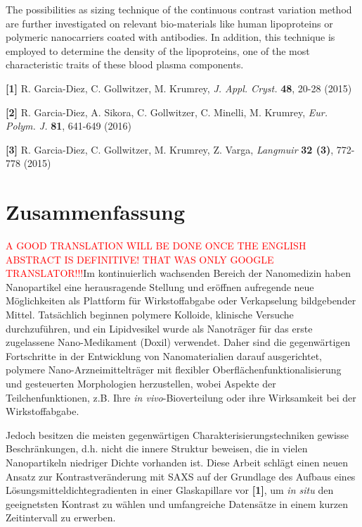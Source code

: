 The possibilities as sizing technique of the continuous contrast variation method are further investigated on relevant bio-materials like human lipoproteins or polymeric nanocarriers coated with antibodies. In addition, this technique is employed to determine the density of the lipoproteins, one of the most characteristic traits of these blood plasma components.

\bigskip
\footnotesize{

\textbf{[1]} R. Garcia-Diez, C. Gollwitzer, M. Krumrey, \emph{J. Appl. Cryst.} \textbf{48}, 20-28 (2015)

\textbf{[2]} R. Garcia-Diez, A. Sikora, C. Gollwitzer, C. Minelli, M. Krumrey, \emph{Eur. Polym. J.} \textbf{81}, 641-649 (2016)

\textbf{[3]} R. Garcia-Diez, C. Gollwitzer, M. Krumrey, Z. Varga, \emph{Langmuir} \textbf{32 (3)}, 772-778 (2015)

}
\normalsize

\cleardoublepage

\thispagestyle{empty}

\chapter*{Zusammenfassung}

\textcolor{red}{A GOOD TRANSLATION WILL BE DONE ONCE THE ENGLISH ABSTRACT IS DEFINITIVE! THAT WAS ONLY GOOGLE TRANSLATOR!!!}Im kontinuierlich wachsenden Bereich der Nanomedizin haben Nanopartikel eine herausragende Stellung und eröffnen aufregende neue Möglichkeiten als Plattform für Wirkstoffabgabe oder Verkapselung bildgebender Mittel. Tatsächlich beginnen polymere Kolloide, klinische Versuche durchzuführen, und ein Lipidvesikel wurde als Nanoträger für das erste zugelassene Nano-Medikament (Doxil) verwendet. Daher sind die gegenwärtigen Fortschritte in der Entwicklung von Nanomaterialien darauf ausgerichtet, polymere Nano-Arzneimittelträger mit flexibler Oberflächenfunktionalisierung und gesteuerten Morphologien herzustellen, wobei Aspekte der Teilchenfunktionen, z.B. Ihre \emph{in vivo}-Bioverteilung oder ihre Wirksamkeit bei der Wirkstoffabgabe.

Jedoch besitzen die meisten gegenwärtigen Charakterisierungstechniken gewisse Beschränkungen, d.h. nicht die innere Struktur beweisen, die in vielen Nanopartikeln niedriger Dichte vorhanden ist. Diese Arbeit schlägt einen neuen Ansatz zur Kontrastveränderung mit SAXS auf der Grundlage des Aufbaus eines Lösungsmitteldichtegradienten in einer Glaskapillare vor \textbf{[1]}, um \emph{in situ} den geeignetsten Kontrast zu wählen und umfangreiche Datensätze in einem kurzen Zeitintervall zu erwerben.


